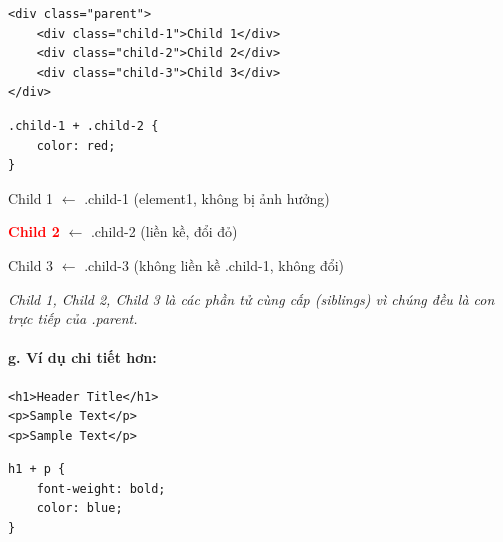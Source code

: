 \documentclass[11pt,oneside]{book}
\begin{document}
\begin{codeWindow}
\begin{lstlisting}[language=HTML5]
<div class="parent">
    <div class="child-1">Child 1</div>
    <div class="child-2">Child 2</div>
    <div class="child-3">Child 3</div>
</div>
\end{lstlisting}

\begin{lstlisting}[language=CSS3]
.child-1 + .child-2 {
    color: red;
}
\end{lstlisting}
\end{codeWindow}

\begin{browserWindow}
\sffamily\small
\begin{tcolorbox}[arc=2pt, colback=primaryBlue!5, colframe=primaryBlue!40, boxrule=1pt, title={\sffamily\small\color{white}\textbf{.parent (Phần tử cha)}}, colbacktitle=primaryBlue!70]
\textcolor{darkText}{Child 1} {\small\textcolor{gray!60}{$\leftarrow$ .child-1 (element1, không bị ảnh hưởng)}} \par\vspace{3pt}
\textcolor{red}{\textbf{Child 2}} {\small\textcolor{gray!60}{$\leftarrow$ .child-2 (liền kề, đổi đỏ)}} \par\vspace{3pt}
\textcolor{darkText}{Child 3} {\small\textcolor{gray!60}{$\leftarrow$ .child-3 (không liền kề .child-1, không đổi)}}
\end{tcolorbox}
\textcolor{gray!70}{\small\textit{Child 1, Child 2, Child 3 là các phần tử cùng cấp (siblings) vì chúng đều là con trực tiếp của .parent.}}
\end{browserWindow}

\paragraph{g. Ví dụ chi tiết hơn:}
\begin{codeWindow}
\begin{lstlisting}[language=HTML5]
<h1>Header Title</h1>
<p>Sample Text</p>
<p>Sample Text</p>
\end{lstlisting}

\begin{lstlisting}[language=CSS3]
h1 + p {
    font-weight: bold;
    color: blue;
}
\end{lstlisting}
\end{codeWindow}
\end{document}
